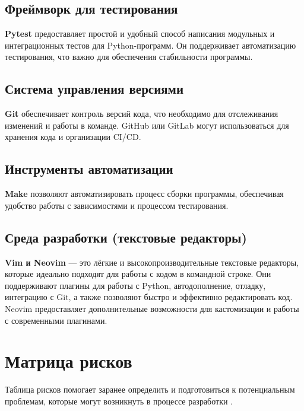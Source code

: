 \subsection{Фреймворк для тестирования}
\textbf{Pytest} предоставляет простой
и удобный способ написания модульных
и интеграционных тестов для Python-программ.
Он поддерживает автоматизацию тестирования,
что важно для обеспечения стабильности программы.

\subsection{Система управления версиями}
\textbf{Git} обеспечивает контроль версий кода,
что необходимо для отслеживания изменений и работы в команде.
GitHub или GitLab могут использоваться для хранения кода и организации CI/CD.

\subsection{Инструменты автоматизации}
\textbf{Make} позволяют автоматизировать процесс сборки программы,
обеспечивая удобство работы с зависимостями и процессом тестирования.

\subsection{Среда разработки (текстовые редакторы)}
\textbf{Vim и Neovim} --- это лёгкие
и высокопроизводительные текстовые редакторы,
которые идеально подходят для работы с кодом в командной строке.
Они поддерживают плагины для работы с Python, автодополнение, отладку,
интеграцию с Git, а также позволяют быстро
и эффективно редактировать код.
Neovim предоставляет дополнительные возможности
для кастомизации и работы с современными плагинами.

\section{Матрица рисков}

Таблица рисков помогает заранее определить
и подготовиться к потенциальным проблемам,
которые могут возникнуть в процессе разработки .

